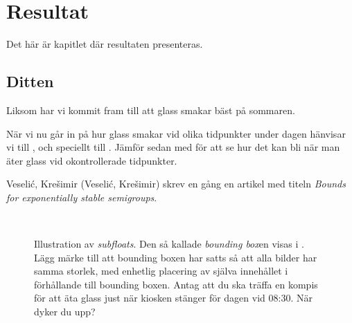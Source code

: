 \chapter{Resultat}\label{cha:Research}
%
Det här är kapitlet där resultaten presenteras.


\section{Ditten}\label{sec:research:history}
%
Liksom \citep{Duck:2005} har vi kommit fram till att glass smakar bäst på sommaren.



När vi nu går in på hur glass smakar vid olika tidpunkter under dagen hänvisar vi till , och speciellt till .  Jämför sedan med  för att se hur det kan bli när man äter glass vid okontrollerade tidpunkter.

Veselić, Krešimir (Veseli\'{c}, Kre\v{s}imir) skrev en gång en artikel med titeln \emph{Bounds for exponentially stable semigroups}.

\begin{figure}[tbp]
  \centering
  \qquad
  \\
  \qquad
  \caption{\label{fig:times}%
    Illustration av \emph{subfloats}.  Den så kallade \emph{bounding box}en visas i .  Lägg märke till att bounding boxen har satts så att alla bilder har samma storlek, med enhetlig placering av själva innehållet i förhållande till bounding boxen.  Antag att du ska träffa en kompis för att äta glass just när kiosken stänger för dagen vid 08:30.  När dyker du upp?}
\end{figure}

